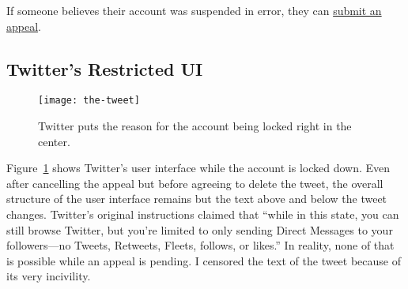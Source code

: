 If someone believes their account was suspended in error, they can
\href{https://web.archive.org/web/20220905021323/https://help.twitter.com/forms/general?subtopic=suspended}{submit
an appeal}.


\subsection{Twitter's Restricted UI}
\label{app:twitter-staging}

\begin{figure}
\centering
\texttt{[image: the-tweet]}
\caption{Twitter puts the reason for the account being locked right in the center.}
\label{fig:thetweet}
\end{figure}

Figure~\ref{fig:thetweet} shows Twitter's user interface while the account is
locked down. Even after cancelling the appeal but before agreeing to delete the
tweet, the overall structure of the user interface remains but the text above
and below the tweet changes. Twitter's original instructions claimed that
``while in this state, you can still browse Twitter, but you're limited to only
sending Direct Messages to your followers---no Tweets, Retweets, Fleets,
follows, or likes.'' In reality, none of that is possible while an appeal is
pending. I censored the text of the tweet because of its very incivility.
